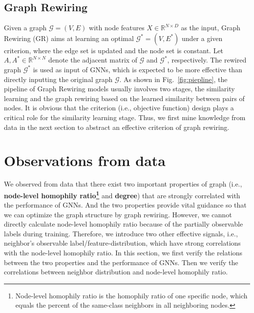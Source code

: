 \documentclass[sigconf]{acmart}
\begin{document}
	\subsection{Graph Rewiring}
	Given a graph $\mathcal{G} =(V, E)$ with node features $X\in \mathbb{R}^{N\times D}$ as the input, Graph Rewiring (GR) aims at learning an optimal $\mathcal{G}^* = (V, E^*)$ under a given criterion, where the edge set is updated and the node set is constant. Let $A, A^*\in\mathbb{R}^{N\times N}$ denote the adjacent matrix of $\mathcal{G}$ and $\mathcal{G^*}$, respectively. The rewired graph $\mathcal{G}^*$ is used as input of GNNs, which is expected to be more effective than directly inputting the original graph $\mathcal{G}$. As shown in Fig.~\ref{fig:piepline}, the pipeline of Graph Rewiring models usually involves two stages, the similarity learning and the graph rewiring based on the learned similarity between pairs of nodes. It is obvious that the criterion (i.e., objective function) design plays a critical role for the similarity learning stage. Thus, we first mine knowledge from data in the next section to abstract an effective criterion of graph rewiring. 	\section{Observations from data}
	\label{section:findings}
    We observed from data that there exist two important properties of graph (i.e., \textbf{node-level homophily ratio\footnote{Node-level homophily ratio is the homophily ratio of one specific node, which equals the percent of the same-class neighbors in all neighboring nodes.}} and \textbf{degree}) that are strongly correlated with the performance of GNNs. And the two properties provide vital guidance so that we can optimize the graph structure by graph rewiring. However, we cannot directly calculate node-level homophily ratio because of the partially observable labels during training. Therefore, we introduce two other effective signals, i.e., neighbor's observable label/feature-distribution, which have strong correlations with the node-level homophily ratio. In this section, we first verify the relations between the two properties and the performance of GNNs. Then we verify the correlations between neighbor distribution and node-level homophily ratio.
\end{document}
